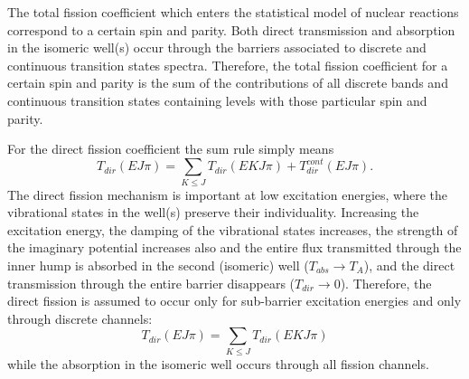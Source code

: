 \documentclass[twocolumn,amsmath,amssymb,10pt,groupedaddress,a4paper]{revtex4}
\begin{document}
The total fission coefficient which enters the statistical model of nuclear reactions
correspond to a certain spin and parity. Both direct transmission and absorption in the
isomeric well(s) occur through the barriers associated to discrete and continuous transition
states spectra. Therefore, the total fission coefficient for a certain
spin and parity is the sum of the contributions of all discrete bands and continuous transition
states containing levels with those particular spin and parity.

For the direct fission coefficient the sum rule simply means
%
\begin{equation}
T_{dir}(EJ\pi)= \sum_{K\le J}T_{dir}(EKJ\pi)+ T_{dir}^{cont}(EJ\pi).
\end{equation}
The direct fission mechanism is important at low excitation energies, where the vibrational
states in the well(s) preserve their individuality. Increasing the excitation energy,
the damping of the vibrational states increases,
the strength of the imaginary potential
increases also and the entire flux transmitted through the inner hump is absorbed
in the second (isomeric) well ($T_{abs}\rightarrow T_{A}$), and the direct
transmission through the entire barrier disappears ($T_{dir}\rightarrow0$).
Therefore, the direct fission is assumed to occur only for sub-barrier excitation energies
and only through discrete channels:
\begin{equation}
T_{dir}(EJ\pi)=\sum_{K\le J}T_{dir}(EKJ\pi) \label{tdirt}%
\end{equation}
while the absorption in the isomeric well occurs through all fission channels.
\end{document}
